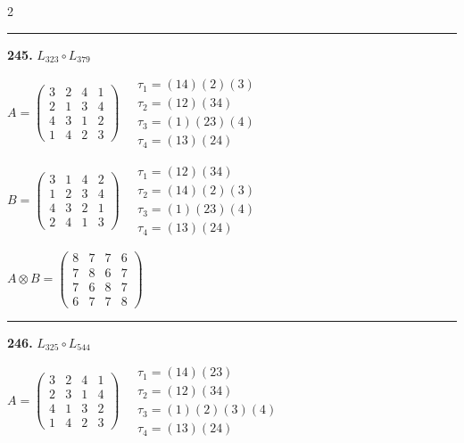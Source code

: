\begin{multicols}{2}
\vspace{0.3em}
\hrule
\vspace{0.3em}

\noindent\textbf{245.} $L_{323} \circ L_{379}$

$A = \begin{pmatrix} 3 & 2 & 4 & 1 \\ 2 & 1 & 3 & 4 \\ 4 & 3 & 1 & 2 \\ 1 & 4 & 2 & 3 \end{pmatrix} \quad \begin{matrix} \tau_{1}=(1 4)(2)(3) \\ \tau_{2}=(1 2)(3 4) \\ \tau_{3}=(1)(2 3)(4) \\ \tau_{4}=(1 3)(2 4) \end{matrix}$

$B = \begin{pmatrix} 3 & 1 & 4 & 2 \\ 1 & 2 & 3 & 4 \\ 4 & 3 & 2 & 1 \\ 2 & 4 & 1 & 3 \end{pmatrix} \quad \begin{matrix} \tau_{1}=(1 2)(3 4) \\ \tau_{2}=(1 4)(2)(3) \\ \tau_{3}=(1)(2 3)(4) \\ \tau_{4}=(1 3)(2 4) \end{matrix}$

$A \otimes B = \begin{pmatrix} 8 & 7 & 7 & 6 \\ 7 & 8 & 6 & 7 \\ 7 & 6 & 8 & 7 \\ 6 & 7 & 7 & 8 \end{pmatrix}$

\vspace{0.3em}
\hrule
\vspace{0.3em}

\noindent\textbf{246.} $L_{325} \circ L_{544}$

$A = \begin{pmatrix} 3 & 2 & 4 & 1 \\ 2 & 3 & 1 & 4 \\ 4 & 1 & 3 & 2 \\ 1 & 4 & 2 & 3 \end{pmatrix} \quad \begin{matrix} \tau_{1}=(1 4)(2 3) \\ \tau_{2}=(1 2)(3 4) \\ \tau_{3}=(1)(2)(3)(4) \\ \tau_{4}=(1 3)(2 4) \end{matrix}$


\end{multicols}
